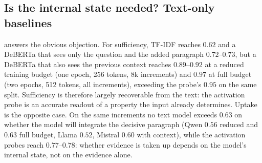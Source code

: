 \subsection{Is the internal state needed? Text-only baselines}
\label{sec:text}
 answers the obvious objection. For sufficiency, TF-IDF reaches $0.62$ and a DeBERTa that sees only the question and the added paragraph $0.72$--$0.73$, but a DeBERTa that also sees the previous context reaches $0.89$--$0.92$ at a reduced training budget (one epoch, 256 tokens, 8k increments) and $0.97$ at full budget (two epochs, 512 tokens, all increments), exceeding the probe's $0.95$ on the same split. Sufficiency is therefore largely recoverable from the text: the activation probe is an accurate readout of a property the input already determines. Uptake is the opposite case. On the same increments no text model exceeds $0.63$ on whether the model will integrate the decisive paragraph (Qwen $0.56$ reduced and $0.63$ full budget, Llama $0.52$, Mistral $0.60$ with context), while the activation probes reach $0.77$--$0.78$: whether evidence is taken up depends on the model's internal state, not on the evidence alone.

\begin{table}[t]
\centering\small

\caption{Text-only classifiers on the same increments and splits versus the activation probe (document split).}
\label{tab:text}
\end{table}


